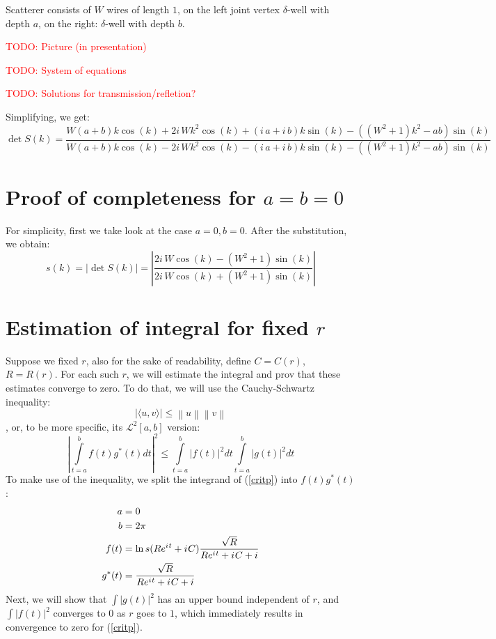 \documentclass[12pt, a4paper]{article}
\newcommand{\abs}[1]{\left| #1 \right|}
\newcommand{\mcL}{\mathcal{L}}
\newcommand{\eexp}[1]{e^{#1}}
\newcommand{\iu}{{i\mkern1mu}}
\newcommand{\todo}[1]{{\large \textcolor{red}{TODO: #1}}}
\begin{document}
Scatterer consists of $W$ wires of length $1$, on the left joint vertex $\delta$-well with depth $a$, on the right: $\delta$-well with depth $b$. 

\todo{Picture (in presentation)}

\todo{System of equations}

\todo{Solutions for transmission/refletion?}

Simplifying, we get:
\[
\det S(k) = \frac{W {\left(a + b\right)} k \cos\left(k\right) + 2 i \, W k^{2} \cos\left(k\right) + {\left(i \, a + i \, b\right)} k \sin\left(k\right) - {\left({\left(W^{2} + 1\right)} k^{2} - a b\right)} \sin\left(k\right)}{W {\left(a + b\right)} k \cos\left(k\right) - 2 i \, W k^{2} \cos\left(k\right) - {\left(i \, a + i \, b\right)} k \sin\left(k\right) - {\left({\left(W^{2} + 1\right)} k^{2} - a b\right)} \sin\left(k\right)}
\]


\section{Proof of completeness for $a = b = 0$}
For simplicity, first we take look at the case $a = 0, b = 0$. After the substitution, we obtain:
\[
s(k) = \abs{\det S(k)} = \abs{\frac{2 i \, W \cos\left(k\right) - {\left(W^{2} + 1\right)} \sin\left(k\right)}{2 i \, W \cos\left(k\right) + {\left(W^{2} + 1\right)} \sin\left(k\right)}}
\]

\section{Estimation of integral for fixed $r$}

Suppose we fixed $r$, also for the sake of readability, define $C = C(r)$, $R = R(r)$. For each such $r$, we will estimate the integral and prov that these estimates converge to zero. To do that, we will use the Cauchy-Schwartz inequality:
\[
\big| \langle u,v \rangle \big| \leq \left\|u\right\| \left\|v\right\|
\]
, or, to be more specific, its $\mcL^2[a, b]$ version:
\[
\abs{
\int\limits_{t=a}^{b} f(t) g^*(t) dt
}^2
\le
\int\limits_{t=a}^b \abs{f(t)}^2 dt 
\int\limits_{t=a}^b \abs{g(t)}^2 dt 
\]
% 
To make use of the inequality, we split the integrand of (\ref{critp}) into $f(t) g^*(t)$:
\begin{align*}
a      &= 0 \\
b      &= 2 \pi \\
f(t)   &= \ln s(R \eexp{\iu t} + \iu C) \frac{\sqrt{R}}{R \eexp{\iu t} + \iu C + i} \\
g^*(t) &= \frac{\sqrt{R}}{R \eexp{\iu t} + \iu C + i}
\end{align*}
Next, we will show that $\int \abs{g(t)}^2$ has an upper bound independent of $r$, and $\int \abs{f(t)}^2$ converges to $0$ as $r$ goes to $1$, which immediately results in convergence to zero for (\ref{critp}).
\end{document}
